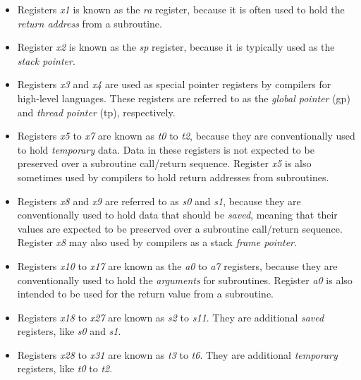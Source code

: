 \documentclass[11pt, twoside, pdftex]{article}
\begin{document}
\begin{itemize}
\item Registers {\it x1} is known as the {\it ra} register, because it is often used
to hold the {\it return address} from a subroutine. 
\item Register {\it x2} is known as the {\it sp} register, because it is typically used 
as the {\it stack pointer}. 
\item Registers {\it x3} and {\it x4} are used as special pointer registers by compilers
for high-level languages. These registers are referred to as the {\it global pointer} (gp) and 
{\it thread pointer} (tp), respectively. 
\item Registers {\it x5} to {\it x7} are known as {\it t0} to {\it t2}, because they are
conventionally used to hold {\it temporary} data. Data in these registers is not expected 
to be preserved over a subroutine call/return sequence. Register {\it x5} is also sometimes 
used by compilers to hold return addresses from subroutines.
\item Registers {\it x8} and {\it x9} are referred to as {\it s0} and {\it s1}, because 
they are conventionally used to hold data that should be {\it saved}, meaning that their 
values are expected to be preserved over a subroutine call/return sequence.
Register {\it x8} may also used by compilers as a stack {\it frame pointer}.
\item Registers {\it x10} to {\it x17} are known as the {\it a0} to {\it a7} registers, 
because they are conventionally used to hold the {\it arguments} for subroutines. 
Register {\it a0} is also intended to be used for the return value from a subroutine. 
\item Registers {\it x18} to {\it x27} are known as {\it s2} to {\it s11}. They are
additional {\it saved} registers, like {\it s0} and {\it s1}.
\item Registers {\it x28} to {\it x31} are known as {\it t3} to {\it t6}. They are
additional {\it temporary} registers, like {\it t0} to {\it t2}. 
\end{itemize}
\end{document}
